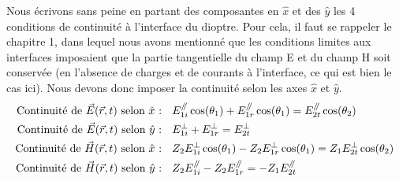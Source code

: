 

Nous écrivons sans peine en partant des composantes en $\hat{x}$ et des $\hat{y}$ les 4 conditions de continuité à l'interface du dioptre. Pour cela, il faut se rappeler le chapitre 1, dans lequel nous avons mentionné que les conditions limites aux interfaces imposaient que la partie tangentielle du champ E et du champ H soit conservée (en l'absence de charges et de courants à l'interface, ce qui est bien le cas ici). Nous devons donc imposer la continuité selon les axes $\hat{x}$ et $\hat{y}$. %
\begin{equation*}
\begin{split}
\mbox{Continuité de $\vec{E}(\vec{r},t)$ selon $\hat{x}$ : }&\hspace{5pt} E^{\mathbin{/\mkern-5mu/}}_{1i} \cos(\theta_{1}) +E^{\mathbin{/\mkern-5mu/}}_{1r} \cos(\theta_{1}) = E^{\mathbin{/\mkern-5mu/}}_{2t} \cos(\theta_{2})\\
\mbox{Continuité de $\vec{E}(\vec{r},t)$ selon $\hat{y}$ : }&\hspace{5pt} E_{1i}^{\perp} + E_{1r}^{\perp} = E_{2t}^{\perp}  \\
\mbox{Continuité de $\vec{H}(\vec{r},t)$ selon $\hat{x}$ : }&\hspace{5pt} Z_2E^{\perp}_{1i}\cos(\theta_{1}) - Z_2E^{\perp}_{1r} \cos(\theta_{1}) = Z_1E^{\perp}_{2t} \cos(\theta_{2})   \\
\mbox{Continuité de $\vec{H}(\vec{r},t)$ selon $\hat{y}$ : }&\hspace{5pt} Z_2E^{\mathbin{/\mkern-5mu/}}_{1i} - Z_2E_{1r}^{\mathbin{/\mkern-5mu/}} = -Z_1E_{2t}^{\mathbin{/\mkern-5mu/}}
\end{split}
\end{equation*}
  
